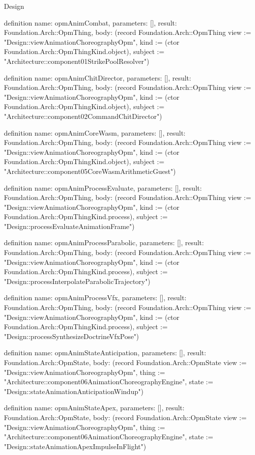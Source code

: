 \begin{lexlean}{Design}
\begin{semanticmodule}
definition{
  name: opmAnimCombat,
  parameters: [],
  result: Foundation.Arch::OpmThing,
  body: (record Foundation.Arch::OpmThing {view := "Design::viewAnimationChoreographyOpm", kind := (ctor Foundation.Arch::OpmThingKind.object), subject := "Architecture::component01StrikePoolResolver"})
}

definition{
  name: opmAnimChitDirector,
  parameters: [],
  result: Foundation.Arch::OpmThing,
  body: (record Foundation.Arch::OpmThing {view := "Design::viewAnimationChoreographyOpm", kind := (ctor Foundation.Arch::OpmThingKind.object), subject := "Architecture::component02CommandChitDirector"})
}

definition{
  name: opmAnimCoreWasm,
  parameters: [],
  result: Foundation.Arch::OpmThing,
  body: (record Foundation.Arch::OpmThing {view := "Design::viewAnimationChoreographyOpm", kind := (ctor Foundation.Arch::OpmThingKind.object), subject := "Architecture::component05CoreWasmArithmeticGuest"})
}

definition{
  name: opmAnimProcessEvaluate,
  parameters: [],
  result: Foundation.Arch::OpmThing,
  body: (record Foundation.Arch::OpmThing {view := "Design::viewAnimationChoreographyOpm", kind := (ctor Foundation.Arch::OpmThingKind.process), subject := "Design::processEvaluateAnimationFrame"})
}

definition{
  name: opmAnimProcessParabolic,
  parameters: [],
  result: Foundation.Arch::OpmThing,
  body: (record Foundation.Arch::OpmThing {view := "Design::viewAnimationChoreographyOpm", kind := (ctor Foundation.Arch::OpmThingKind.process), subject := "Design::processInterpolateParabolicTrajectory"})
}

definition{
  name: opmAnimProcessVfx,
  parameters: [],
  result: Foundation.Arch::OpmThing,
  body: (record Foundation.Arch::OpmThing {view := "Design::viewAnimationChoreographyOpm", kind := (ctor Foundation.Arch::OpmThingKind.process), subject := "Design::processSynthesizeDoctrineVfxPose"})
}

definition{
  name: opmAnimStateAnticipation,
  parameters: [],
  result: Foundation.Arch::OpmState,
  body: (record Foundation.Arch::OpmState {view := "Design::viewAnimationChoreographyOpm", thing := "Architecture::component06AnimationChoreographyEngine", state := "Design::stateAnimationAnticipationWindup"})
}

definition{
  name: opmAnimStateApex,
  parameters: [],
  result: Foundation.Arch::OpmState,
  body: (record Foundation.Arch::OpmState {view := "Design::viewAnimationChoreographyOpm", thing := "Architecture::component06AnimationChoreographyEngine", state := "Design::stateAnimationApexImpulseInFlight"})
}


\end{semanticmodule}
\end{lexlean}
